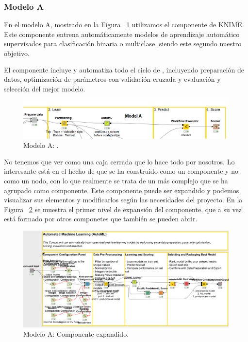 \subsubsection{Modelo A}

En el modelo A, mostrado en la Figura ~\ref{fig:workflowA1} utilizamos el componente  de KNIME. Este componente entrena automáticamente modelos 
de aprendizaje automático supervisados para clasificación binaria o multiclase, siendo este segundo nuestro objetivo. 

El componente incluye y automatiza todo el ciclo de , incluyendo preparación de datos, optimización 
de parámetros con validación cruzada y evaluación y selección del mejor modelo. 

\begin{figure}[!htb]
	\centering
	\includegraphics[width=1\textwidth]{img/workflowA1.png}
	\caption{Modelo A: .}
	\label{fig:workflowA1}
\end{figure}
\FloatBarrier

No tenemos que ver  como una caja cerrada que lo hace todo por nosotros. Lo interesante está en el hecho de que 
 se ha construido como un componente y no como un nodo, con lo que realmente se trata de un  más complejo 
que se ha agrupado como componente. Este componente puede ser expandido y podemos visualizar sus elementos y modificarlos 
según las necesidades del proyecto. En la Figura ~\ref{fig:workflowA3} se muestra el primer nivel de expansión del componente,
que a su vez está formado por otros componetes que también se pueden abrir. 

\begin{figure}[!htb]
	\centering
	\includegraphics[width=1\textwidth]{img/workflowA3.png}
	\caption{Modelo A: Componente  expandido.}
	\label{fig:workflowA3}
\end{figure}
\FloatBarrier

